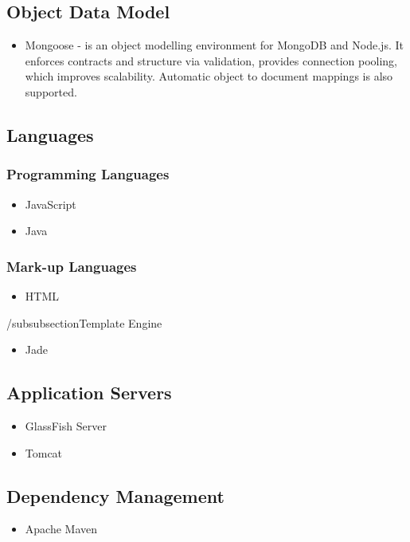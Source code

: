 \subsection{Object Data Model}
\begin{itemize}
	\item Mongoose - is an object modelling environment for MongoDB and Node.js. It enforces contracts and structure via validation, provides connection pooling, which improves scalability. Automatic object to document mappings is also supported.
\end{itemize}

\subsection{Languages}
\subsubsection{Programming Languages}
\begin{itemize}
	\item JavaScript	
	\item Java
\end{itemize}

\subsubsection{Mark-up Languages}
\begin{itemize}
	\item HTML
\end{itemize}

/subsubsection{Template Engine}
\begin{itemize}
	\item Jade
\end{itemize}


\subsection{Application Servers}
\begin{itemize}
	\item GlassFish Server
	\item Tomcat
\end{itemize}

\subsection{Dependency Management}
\begin{itemize}
	\item Apache Maven
\end{itemize}

